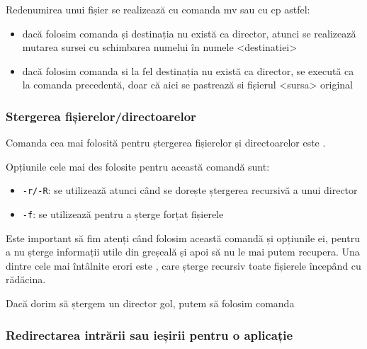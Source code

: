Redenumirea unui fișier se realizează cu comanda mv sau cu cp astfel:

\begin{itemize}
	\item dacă folosim comanda  și destinația
		nu există ca director, atunci se realizează mutarea sursei cu
		schimbarea numelui în numele <destinatiei>
	\item dacă folosim comanda  si la fel
		destinația nu există ca director, se execută ca la comanda
		precedentă, doar că aici se pastrează si fișierul <sursa>
		original
\end{itemize}


\subsubsection{Stergerea fișierelor/directoarelor}
\label{sec:file-system-file-rm}

Comanda cea mai folosită pentru ștergerea fișierelor și directoarelor este
.

Opțiunile cele mai des folosite pentru această comandă sunt:

\begin{itemize}
	\item \texttt{-r/-R}: se utilizează atunci când se dorește ștergerea
		recursivă a unui director
	\item \texttt{-f}: se utilizează pentru a șterge forțat fișierele
\end{itemize}

Este important să fim atenți când folosim această comandă și opțiunile ei,
pentru a nu șterge informații utile din greșeală și apoi să nu le mai putem
recupera. Una dintre cele mai întâlnite erori este , care șterge
recursiv toate fișierele începând cu rădăcina.

\begin{note}[Observație]

Dacă dorim să ștergem un director gol, putem să folosim comanda

\end{note}

\subsubsection{Redirectarea intrării sau ieșirii pentru o aplicație}
\label{sec:file-system-redirect}

